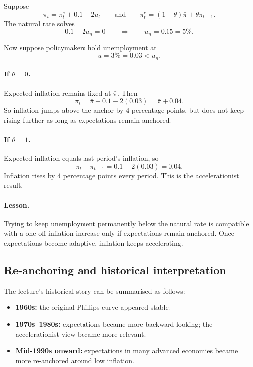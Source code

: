 \documentclass[12pt]{article}
\begin{document}
\begin{examplebox}[title={Worked Example: Holding unemployment below the natural rate}]
Suppose
\[
\pi_t=\pi_t^e+0.1-2u_t
\qquad\text{and}\qquad
\pi_t^e=(1-\theta)\bar{\pi}+\theta\pi_{t-1}.
\]
The natural rate solves
\[
0.1-2u_n=0
\qquad\Rightarrow\qquad
u_n=0.05=5\%.
\]

Now suppose policymakers hold unemployment at
\[
u=3\%=0.03<u_n.
\]

\paragraph{If $\theta=0$.}
Expected inflation remains fixed at $\bar{\pi}$. Then
\[
\pi_t=\bar{\pi}+0.1-2(0.03)=\bar{\pi}+0.04.
\]
So inflation jumps above the anchor by 4 percentage points, but does not keep rising further as long as expectations remain anchored.

\paragraph{If $\theta=1$.}
Expected inflation equals last period's inflation, so
\[
\pi_t-\pi_{t-1}=0.1-2(0.03)=0.04.
\]
Inflation rises by 4 percentage points every period. This is the accelerationist result.

\paragraph{Lesson.}
Trying to keep unemployment permanently below the natural rate is compatible with a one-off inflation increase only if expectations remain anchored. Once expectations become adaptive, inflation keeps accelerating.
\end{examplebox}

\subsection{Re-anchoring and historical interpretation}

The lecture's historical story can be summarised as follows:
\begin{itemize}[leftmargin=1.5em]
\item \textbf{1960s:} the original Phillips curve appeared stable.
\item \textbf{1970s--1980s:} expectations became more backward-looking; the accelerationist view became more relevant.
\item \textbf{Mid-1990s onward:} expectations in many advanced economies became more re-anchored around low inflation.
\end{itemize}
\end{document}

